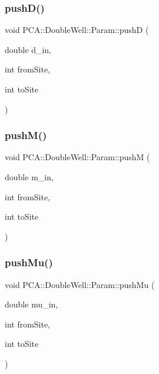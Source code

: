 \hypertarget{class_p_c_a_1_1_double_well_1_1_param_aae4addc9ff6ffe5f7e5e175a57b345ef}{}\label{class_p_c_a_1_1_double_well_1_1_param_aae4addc9ff6ffe5f7e5e175a57b345ef} 
\subsubsection{\texorpdfstring{push\+D()}{pushD()}}
{\footnotesize\ttfamily void P\+C\+A\+::\+Double\+Well\+::\+Param\+::pushD (\begin{DoxyParamCaption}\item[{double}]{d\+\_\+in,  }\item[{int}]{from\+Site,  }\item[{int}]{to\+Site }\end{DoxyParamCaption})}

\hypertarget{class_p_c_a_1_1_double_well_1_1_param_a27949d3412e3f75abb82293faa2c11d4}{}\label{class_p_c_a_1_1_double_well_1_1_param_a27949d3412e3f75abb82293faa2c11d4} 
\subsubsection{\texorpdfstring{push\+M()}{pushM()}}
{\footnotesize\ttfamily void P\+C\+A\+::\+Double\+Well\+::\+Param\+::pushM (\begin{DoxyParamCaption}\item[{double}]{m\+\_\+in,  }\item[{int}]{from\+Site,  }\item[{int}]{to\+Site }\end{DoxyParamCaption})}

\hypertarget{class_p_c_a_1_1_double_well_1_1_param_a98b94a42625e4994c92da05c5c33999c}{}\label{class_p_c_a_1_1_double_well_1_1_param_a98b94a42625e4994c92da05c5c33999c} 
\subsubsection{\texorpdfstring{push\+Mu()}{pushMu()}}
{\footnotesize\ttfamily void P\+C\+A\+::\+Double\+Well\+::\+Param\+::push\+Mu (\begin{DoxyParamCaption}\item[{double}]{mu\+\_\+in,  }\item[{int}]{from\+Site,  }\item[{int}]{to\+Site }\end{DoxyParamCaption})}

